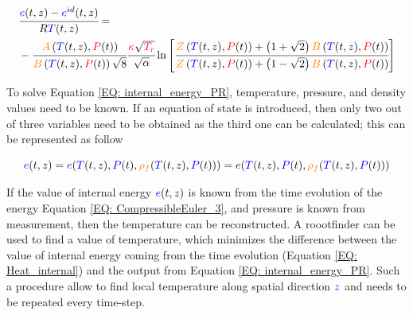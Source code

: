 \documentclass[../Article_Model_Parameters.tex]{subfiles}
\begin{document}
		
			{\scriptsize
				\begin{equation}
					\begin{aligned}
					&\cfrac{{\color{blue}e}(t,z)-{\color{blue}e}^{id}(t,z)}{R{\color{blue}T}(t,z)} = \\
					& - \cfrac{{\color{orange}A}\left({\color{blue}T}(t,z), {\color{red}P}(t)\right)}{{\color{orange}B}\left({\color{blue}T}(t,z), {\color{red}P}(t)\right)\sqrt{8}} \cfrac{{\color{magenta}\kappa} \sqrt{\color{magenta}T_r}}{\sqrt{\alpha}} \ln \left[ \cfrac{{\color{orange}Z}\left({\color{blue}T}(t,z), {\color{red}P}(t)\right)+\left( 1+\sqrt{2} \right){\color{orange}B}\left({\color{blue}T}(t,z), {\color{red}P}(t)\right)}{{\color{orange}Z}\left({\color{blue}T}(t,z), {\color{red}P}(t)\right)+\left( 1-\sqrt{2} \right){\color{orange}B}\left({\color{blue}T}(t,z), {\color{red}P}(t)\right)} \right]
					\label{EQ: internal_energy_PR}
				\end{aligned}
			\end{equation}
			}
			
			To solve Equation \ref{EQ: internal_energy_PR}, temperature, pressure, and density values need to be known. If an equation of state is introduced, then only two out of three variables need to be obtained as the third one can be calculated; this can be represented as follow
			
			{\footnotesize
			\begin{equation}
				{\color{blue}e}(t,z)={\color{blue}e}({\color{blue}T}(t,z),{\color{blue}P}(t),{\color{orange}\rho_f}({\color{blue}T}(t,z),{\color{blue}P}(t)))=e( {\color{blue}T}(t,z),{\color{blue}P}(t), {\color{orange}\rho_f}({\color{blue}T}(t,z),{\color{blue}P}(t)) ) 
			\end{equation}
			}
		
			If the value of internal energy ${\color{blue}e}(t,z)$ is known from the time evolution of the energy Equation \ref{EQ: CompressibleEuler_3}, and pressure is known from measurement, then the temperature can be reconstructed. A roootfinder can be used to find a value of temperature, which minimizes the difference between the value of internal energy coming from the time evolution (Equation \ref{EQ: Heat_internal}) and the output from Equation \ref{EQ: internal_energy_PR}. Such a procedure allow to find local temperature along spatial direction ${\color{blue}z}$ and needs to be repeated every time-step.
			
\end{document}
